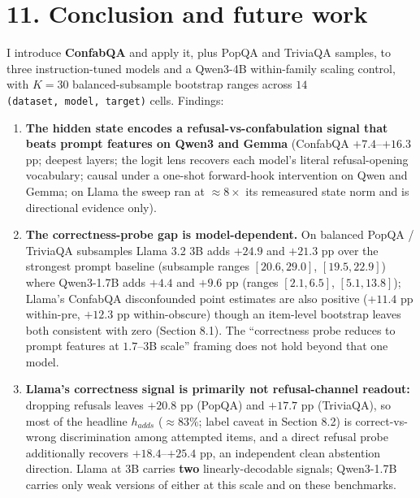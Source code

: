 \section{11. Conclusion and future
work}\label{conclusion-and-future-work}

I introduce \textbf{ConfabQA} and apply it, plus PopQA and TriviaQA
samples, to three instruction-tuned models and a Qwen3-4B within-family
scaling control, with \(K=30\) balanced-subsample bootstrap ranges across
\(14\) \texttt{(dataset,\ model,\ target)} cells. Findings:

\begin{enumerate}
\def\labelenumi{(\roman{enumi})}
\item
  \textbf{The hidden state encodes a refusal-vs-confabulation signal that beats prompt features on Qwen3 and Gemma} (ConfabQA
  \(+7.4\)--\(+16.3\) pp; deepest layers; the logit lens recovers each
  model's literal refusal-opening vocabulary; causal under a one-shot
  forward-hook intervention on Qwen and Gemma; on Llama the sweep ran at
  \(\approx 8\times\) its remeasured state norm and is directional
  evidence only).
\item
  \textbf{The correctness-probe gap is model-dependent.} On
  balanced PopQA / TriviaQA subsamples Llama 3.2 3B adds \(+24.9\) and
  \(+21.3\) pp over the strongest prompt baseline (subsample ranges
  \([20.6, 29.0]\), \([19.5, 22.9]\)) where Qwen3-1.7B adds \(+4.4\) and
  \(+9.6\) pp (ranges \([2.1, 6.5]\), \([5.1, 13.8]\)); Llama's ConfabQA
  disconfounded point estimates are also positive (\(+11.4\) pp
  within-pre, \(+12.3\) pp within-obscure) though an item-level bootstrap
  leaves both consistent with zero (Section 8.1). The ``correctness
  probe reduces to prompt features at \(1.7\)--\(3\)B scale'' framing does not hold beyond that one model.
\item
  \textbf{Llama's correctness signal is primarily not refusal-channel
  readout:} dropping refusals leaves \(+20.8\) pp (PopQA) and
  \(+17.7\) pp (TriviaQA), so most of the headline \(h_{adds}\) (\(\approx 83\%\); label caveat in Section 8.2) is correct-vs-wrong discrimination among attempted items,
  and a direct refusal probe additionally recovers
  \(+18.4\)--\(+25.4\) pp, an independent clean abstention direction.
  Llama at \(3\)B carries \textbf{two} linearly-decodable signals;
  Qwen3-1.7B carries only weak versions of either at this scale and on
  these benchmarks.
\end{enumerate}


